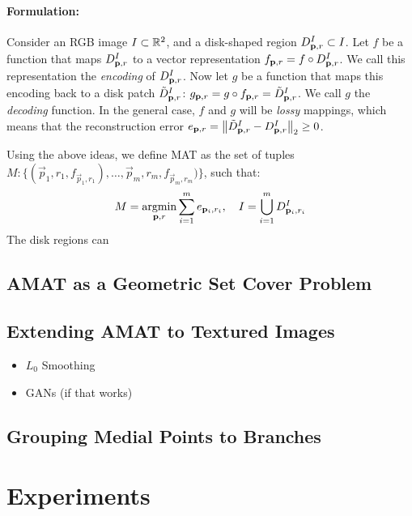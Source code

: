 \documentclass[10pt,twocolumn,letterpaper]{article}
\begin{document}
\paragraph{Formulation:} Consider an RGB image $I\subset\mathbb{R}^2$, and a disk-shaped region $D_{\mathbf{p},r}^I \subset I$.
Let $f$ be a function that maps $D_{\mathbf{p},r}^I$ to a vector representation $f_{\mathbf{p},r}=f\circ D_{\mathbf{p},r}^I$. 
We call this representation the \emph{encoding} of $D_{\mathbf{p},r}^I$. 
Now let $g$ be a function that maps this encoding back to a disk patch $\tilde{D}_{\mathbf{p},r}^I$: 
$g_{\mathbf{p},r} = g \circ f_{\mathbf{p},r} = \tilde{D}_{\mathbf{p},r}^I$. We call $g$ the \emph{decoding} function.
In the general case, $f$ and $g$ will be \emph{lossy} mappings, which means that the reconstruction error 
$e_{\mathbf{p},r} = \left \lVert  \tilde{D}_{\mathbf{p},r}^I - D_{\mathbf{p},r}^I \right \rVert_2 \geq 0$. 

Using the above ideas, we define MAT as the set of tuples 
$M:\{(\vec{p}_1,r_1,f_{\vec{p}_1,r_1}),\ldots,\vec{p}_m,r_m,f_{\vec{p}_m,r_m})\}$, such that:
\begin{equation}
M = \operatorname*{argmin}_{\mathbf{p},r}{\sum_{i=1}^m e_{\mathbf{p}_i,r_i}},\quad I=\bigcup_{i=1}^m D_{\mathbf{p}_i,r_i}^I 
\label{eq:minimization}
\end{equation}
The disk regions can 



\subsection{AMAT as a Geometric Set Cover Problem}

\subsection{Extending AMAT to Textured Images}
\begin{itemize}
\item $L_0$ Smoothing
\item GANs (if that works)
\end{itemize}

\subsection{Grouping Medial Points to Branches}\label{sec:grouping}

\section{Experiments}\label{sec:experiments}
\end{document}
